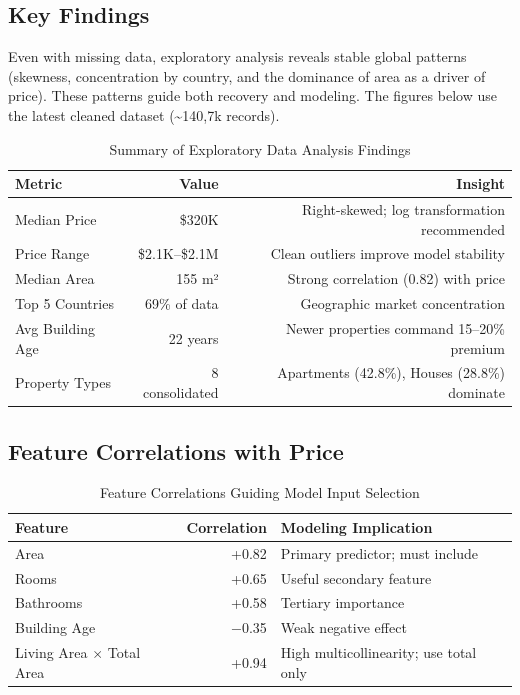 \documentclass[12pt,a4paper]{article}
\begin{document}
\subsection{Key Findings}

Even with missing data, exploratory analysis reveals stable global patterns (skewness, concentration by country, and the dominance of area as a driver of price). These patterns guide both recovery and modeling. The figures below use the latest cleaned dataset (\textasciitilde140{,}7k records).

\begin{table}[H]
\centering\small
\begin{tabular}{lrr}
\toprule
\textbf{Metric} & \textbf{Value} & \textbf{Insight} \\
\midrule
Median Price & \$320K & Right-skewed; log transformation recommended \\
Price Range & \$2.1K--\$2.1M & Clean outliers improve model stability \\
Median Area & 155 m² & Strong correlation (0.82) with price \\
Top 5 Countries & 69\% of data & Geographic market concentration \\
Avg Building Age & 22 years & Newer properties command 15--20\% premium \\
Property Types & 8 consolidated & Apartments (42.8\%), Houses (28.8\%) dominate \\
\bottomrule
\end{tabular}
\caption{Summary of Exploratory Data Analysis Findings}
\label{tbl:eda_summary}
\end{table}

\subsection{Feature Correlations with Price}

\begin{table}[H]
\centering\small
\begin{tabular}{lrl}
\toprule
\textbf{Feature} & \textbf{Correlation} & \textbf{Modeling Implication} \\
\midrule
Area & +0.82 & Primary predictor; must include \\
Rooms & +0.65 & Useful secondary feature \\
Bathrooms & +0.58 & Tertiary importance \\
Building Age & $-$0.35 & Weak negative effect \\
Living Area $\times$ Total Area & +0.94 & High multicollinearity; use total only \\
\bottomrule
\end{tabular}
\caption{Feature Correlations Guiding Model Input Selection}
\end{table}
\end{document}
